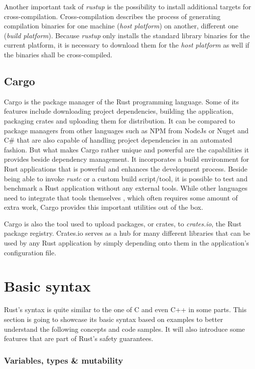 Another important task of \textit{rustup} is the possibility to install additional targets for cross-compilation. Cross-compilation describes the process of generating compilation binaries for one machine (\textit{host platform}) on another, different one (\textit{build platform}). Because \textit{rustup} only installs the standard library binaries for the current platform, it is necessary to download them for the \textit{host platform} as well if the binaries shall be cross-compiled.

\subsection{Cargo}

Cargo is the package manager of the Rust programming language. Some of its features include downloading project dependencies, building the application, packaging crates and uploading them for distribution. It can be compared to package managers from other languages such as NPM from NodeJs or Nuget and C\# that are also capable of handling project dependencies in an automated fashion. But what makes Cargo rather unique and powerful are the capabilities it provides beside dependency management. It incorporates a build environment for Rust applications that is powerful and enhances the development process. Beside being able to invoke \textit{rustc} or a custom build script/tool, it is possible to test and benchmark a Rust application without any external tools. While other languages need to integrate that tools themselves , which often requires some amount of extra work, Cargo provides this important utilities out of the box.

Cargo is also the tool used to upload packages, or crates, to \textit{crates.io}, the Rust package registry. Crates.io serves as a hub for many different libraries that can be used by any Rust application by simply depending onto them in the application's configuration file.

\section{Basic syntax}

Rust's syntax is quite similar to the one of C and even C++ in some parts. This section is going to showcase its basic syntax based on examples to better understand the following concepts and code samples. It will also introduce some features that are part of Rust's safety guarantees. 

\subsubsection{Variables, types \& mutability}

